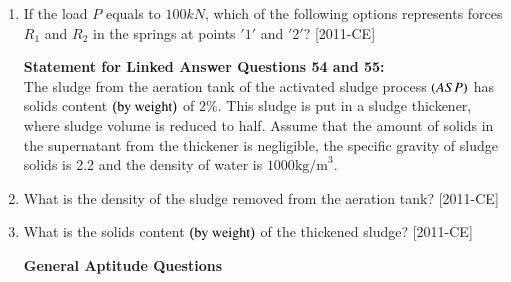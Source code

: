 \documentclass[journal]{IEEEtran}
\begin{document}
\begin{enumerate}[start=53]
\item If the load $P$ equals to $100kN$, which of the following options represents forces $R_1$ and $R_2$ in the springs at points $'1'$ and $'2'$? \hfill{[2011-CE]}
\begin{enumerate}
\end{enumerate}

\textbf{Statement for Linked Answer Questions 54 and 55:}\\
The sludge from the aeration tank of the activated sludge process $\left(ASP\right)$ has solids content $\left(\text{by weight}\right)$ of $2\%$. This sludge is put in a sludge thickener, where sludge volume is reduced to half. Assume that the amount of solids in the supernatant from the thickener is negligible, the specific gravity of sludge solids is 2.2 and the density of water is $1000\text{kg/m}^3$.\\
\item What is the density of the sludge removed from the aeration tank? \hfill{[2011-CE]}
\begin{enumerate}
\end{enumerate}
\item What is the solids content $\left(\text{by weight}\right)$ of the thickened sludge? \hfill{[2011-CE]}
\begin{enumerate}
\end{enumerate}
\textbf{General Aptitude  Questions}\\

\end{enumerate}
\end{document}
